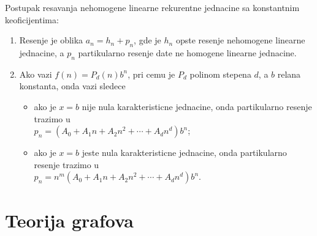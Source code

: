 \documentclass[12p, a4paper]{article}
\begin{document}
\begin{multicols}{2}
    Postupak resavanja nehomogene linearne rekurentne jednacine sa konstantnim
    keoficijentima:

    \begin{enumerate}
        \itemsep0em
        \item Resenje je oblika $a_n = h_n + p_n$, gde je $h_n$ opste resenje
            nehomogene linearne jednacine, a $p_n$ partikularno resenje date
            ne homogene linearne jednacine.
        \item Ako vazi $f(n) = P_d(n) b^n$, pri cemu je $P_d$ polinom stepena
            $d$, a $b$ relana konstanta, onda vazi sledece
        \begin{itemize}
            \itemsep0em
            \item ako je $x = b$ nije nula karakteristicne jednacine, onda
                partikularno resenje trazimo u \\
                $p_n = (A_0 + A_1 n + A_2 n^2 + \cdots + A_d n^d) b^n$;
            \item ako je $x = b$ jeste nula karakteristicne jednacine, onda
                partikularno resenje trazimo u \\
                $p_n = n^m(A_0 + A_1 n + A_2 n^2 + \cdots + A_d n^d) b^n$.
        \end{itemize}
    \end{enumerate}

    \section{Teorija grafova}
    

\end{multicols}
\end{document}
